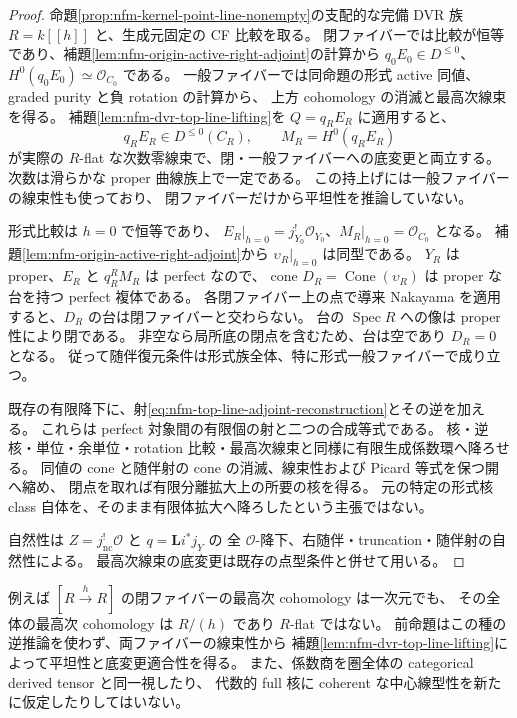 \begin{proof}
命題\ref{prop:nfm-kernel-point-line-nonempty}の支配的な完備 DVR 族
$R=k[[h]]$ と、生成元固定の CF 比較を取る。
閉ファイバーでは比較が恒等であり、補題\ref{lem:nfm-origin-active-right-adjoint}の計算から
$q_0E_0\in D^{\le0}$、$H^0(q_0E_0)\simeq\mathcal O_{C_0}$ である。
一般ファイバーでは同命題の形式 active 同値、graded purity と負 rotation の計算から、
上方 cohomology の消滅と最高次線束を得る。
補題\ref{lem:nfm-dvr-top-line-lifting}を $Q=q_RE_R$ に適用すると、
\[
 q_R E_R\in D^{\le0}(C_R),\qquad
 M_R=H^0(q_R E_R)
\]
が実際の $R$-flat な次数零線束で、閉・一般ファイバーへの底変更と両立する。
次数は滑らかな proper 曲線族上で一定である。
この持上げには一般ファイバーの線束性も使っており、
閉ファイバーだけから平坦性を推論していない。

形式比較は $h=0$ で恒等であり、
$E_R|_{h=0}=j_{Y_0}^!\mathcal O_{Y_0}$、$M_R|_{h=0}=\mathcal O_{C_0}$ となる。
補題\ref{lem:nfm-origin-active-right-adjoint}から
$\upsilon_R|_{h=0}$ は同型である。
$Y_R$ は proper、$E_R$ と $q_R^RM_R$ は perfect なので、
cone $D_R=\operatorname{Cone}(\upsilon_R)$ は proper な台を持つ perfect 複体である。
各閉ファイバー上の点で導来 Nakayama を適用すると、$D_R$ の台は閉ファイバーと交わらない。
台の $\operatorname{Spec}R$ への像は proper 性により閉である。
非空なら局所底の閉点を含むため、台は空であり $D_R=0$ となる。
従って随伴復元条件は形式族全体、特に形式一般ファイバーで成り立つ。

既存の有限降下に、射\eqref{eq:nfm-top-line-adjoint-reconstruction}とその逆を加える。
これらは perfect 対象間の有限個の射と二つの合成等式である。
核・逆核・単位・余単位・rotation 比較・最高次線束と同様に有限生成係数環へ降ろせる。
同値の cone と随伴射の cone の消滅、線束性および Picard 等式を保つ開へ縮め、
閉点を取れば有限分離拡大上の所要の核を得る。
元の特定の形式核 class 自体を、そのまま有限体拡大へ降ろしたという主張ではない。

自然性は $Z=j_{\mathrm{nc}}^!\mathcal O$ と $q=\mathbf Li^*j_Y$ の
全 $\mathcal O$-降下、右随伴・truncation・随伴射の自然性による。
最高次線束の底変更は既存の点型条件と併せて用いる。
\end{proof}

\begin{remark}[平坦な最高次線束を省略しない]
例えば $[R\xrightarrow{h}R]$ の閉ファイバーの最高次 cohomology は一次元でも、
その全体の最高次 cohomology は $R/(h)$ であり $R$-flat ではない。
前命題はこの種の逆推論を使わず、両ファイバーの線束性から
補題\ref{lem:nfm-dvr-top-line-lifting}によって平坦性と底変更適合性を得る。
また、係数商を圏全体の categorical derived tensor と同一視したり、
代数的 full 核に coherent な中心線型性を新たに仮定したりしてはいない。
\end{remark}

